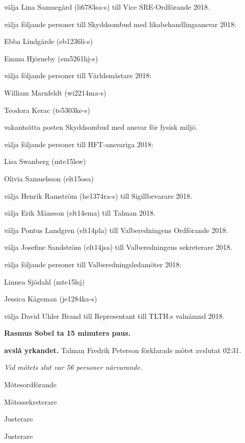 \documentclass[10pt]{article}
\def\mo{Fredrik Peterson}
\def\ms{Johan Karlberg}
\def\ji{David Uhler Brand}
\def\jii{Anders Nilsson}
\begin{document}
\begin{paragrafer}
\begin{paralist}
    \Mba välja Lina Samnegård (li6783sa-s) till Vice SRE-Ordförande 2018.

    \Mba välja följande personer till Skyddsombud med likabehandlingsansvar 2018:
    \begin{tightdashlist}
        \item Ebba Lindgärde (eb1236li-s)
        \item Emma Hjörneby (em5261hj-s)
    \end{tightdashlist}

    \Mba välja följande personer till Världsmästare 2018:
    \begin{tightdashlist}
      \item William Marnfeldt (wi2214ma-s)
      \item Teodora Kerac (te5303ke-s)
    \end{tightdashlist}

    \Mba vakantsätta posten Skyddsombud med ansvar för fysisk miljö.

    \Mba välja följande personer till HFT-ansvariga 2018:
    \begin{tightdashlist}
        \item Lisa Swanberg (mte15lsw)
        \item Olivia Samuelsson (elt15osa)
    \end{tightdashlist}

    \Mba välja Henrik Ramström (he1374ra-s) till Sigillbevarare 2018.

    \Mba välja Erik Månsson (elt14ema) till Talman 2018.


    \Mba välja Pontus Landgren (elt14pla) till Valberedningens Ordförande 2018.

    \Mba välja Josefine Sandström (elt14jsa) till Valberedningens sekreterare 2018.

    \Mba välja följande personer till Valberedningsledamöter 2018:
    \begin{tightdashlist}
        \item Linnea Sjödahl (mte15lsj)
        \item Jessica Kågeman (je1284ka-s)
    \end{tightdashlist}


    \Mba välja David Uhler Brand till Representant till TLTH:s valnämnd 2018.

\end{paralist}

\textbf{Rasmus Sobel \ypa ta 15 minuters paus.}

\textbf{\Mba avslå yrkandet.}
Talman {\mo} förklarade mötet avslutat 02:31.

\emph{Vid mötets slut var 56 personer närvarande.}

\end{paragrafer}

\newpage
\hidesignfoot
\begin{signatures}{4}
\signature{\mo}{Mötesordförande}
\signature{\ms}{Mötessekreterare}
\signature{\ji}{Justerare}
\signature{\jii}{Justerare}
\end{signatures}
\end{document}
